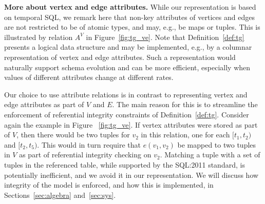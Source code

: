 {\bf More about vertex and edge attributes.} While our \ve
representation is based on temporal SQL, we remark here that non-key
attributes of vertices and edges are not restricted to be of atomic
types, and may, e.g., be maps or tuples. This is illustrated by
relation $A^V$ in Figure~\ref{fig:tg_ve}.  Note that
Definition~\ref{def:tg} presents a logical data structure and may be
implemented, e.g., by a columnar representation of vertex and edge
attributes.  Such a representation would naturally support schema
evolution and can be more efficient, especially when values of
different attributes change at different rates.


Our choice to use attribute relations is in contrast to representing
vertex and edge attributes as part of $V$ and $E$.  The main reason
for this is to streamline the enforcement of referential integrity
constraints of Definition~\ref{def:tg}.  Consider again the example in
Figure ~\ref{fig:tg_ve}.  If vertex attributes were stored as part of
$V$, then there would be two tuples for $v_2$ in this relation, one
for each $[t_1, t_2)$ and $[t_2, t_5)$.  This would in turn require
    that $e(v_1, v_2)$ be mapped to two tuples in $V$ as part of
    referential integrity checking on $v_2$.  Matching a tuple with a
    set of tuples in the referenced table, while supported by the
    SQL:2011 standard, is potentially inefficient, and we avoid it in
    our representation.  We will discuss how integrity of the model is
    enforced, and how this is implemented, in
    Sections~\ref{sec:algebra} and~\ref{sec:sys}.


